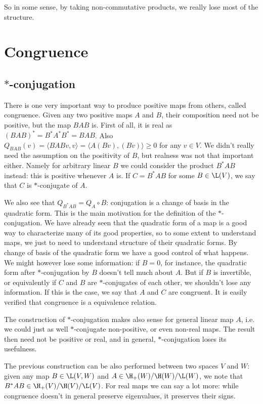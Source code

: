 So in some sense, by taking non-commutative products, we really lose most of the structure.

\section{Congruence}

\subsection{$*$-conjugation}

There is one very important way to produce positive maps from others, called congruence. Given any two positive maps $A$ and $B$, their composition need not be positive, but the map $BAB$ is. First of all, it is real as $(BAB)^{*} = B^{*} A^{*} B^{*} = BAB$. Also $Q_{BAB}(v) = \langle BAB v, v \rangle = \langle A (B v), (B v) \rangle \geq 0$ for any $v \in V$. We didn't really need the assumption on the positivity of $B$, but realness was not that important either. Namely for arbitrary linear $B$ we could consider the product $B^{*}AB$ instead: this is positive whenever $A$ is. If $C = B^{*}AB$ for some $B \in \L(V)$, we say that $C$ is $*$-conjugate of $A$.

We also see that $Q_{B^{*}AB} = Q_{A} \circ B$: conjugation is a change of basis in the quadratic form. This is the main motivation for the definition of the $*$-conjugation. We have already seen that the quadratic form of a map is a good way to characterize many of its good properties, so to some extent to understand maps, we just to need to understand structure of their quadratic forms. By change of basis of the quadratic form we have a good control of what happens. We might however lose some information: if $B = 0$, for instance, the quadratic form after $*$-conjugation by $B$ doesn't tell much about $A$. But if $B$ is invertible, or equivalently if $C$ and $B$ are $*$-conjugates of each other, we shouldn't lose any information. If this is the case, we say that $A$ and $C$ are congruent. It is easily verified that congruence is a equivalence relation.

The construction of $*$-conjugation makes also sense for general linear map $A$, i.e. we could just as well $*$-conjugate non-positive, or even non-real maps. The result then need not be positive or real, and in general, $*$-conjugation loses its usefulness.

The previous construction can be also performed between two spaces $V$ and $W$: given any map $B \in \L(V, W)$ and $A \in \H_{+}(W)/\H(W)/\L(W)$, we note that $B^{*}AB \in \H_{+}(V)/\H(V)/\L(V)$. For real maps we can say a lot more: while congruence doesn't in general preserve eigenvalues, it preserves their signs.


